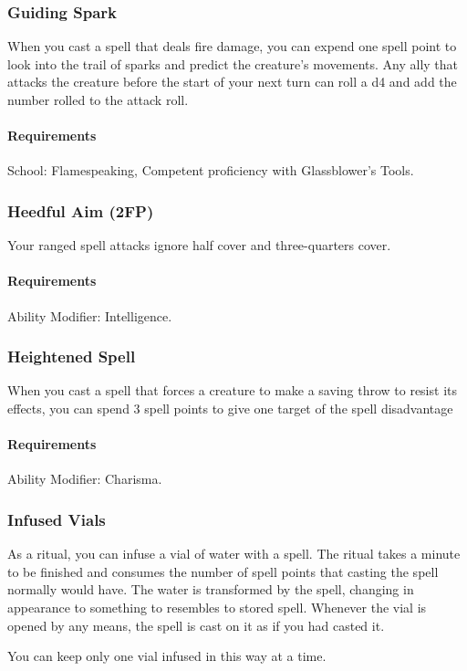 \subsubsection{Guiding Spark} \label{feat::guidingspark}
    When you cast a spell that deals fire damage, you can expend one spell point to look into the trail of sparks and predict the creature's movements.
    Any ally that attacks the creature before the start of your next turn can roll a d4 and add the number rolled to the attack roll.
    \paragraph{Requirements} School: Flamespeaking, Competent proficiency with Glassblower's Tools.
\subsubsection{Heedful Aim (2FP)} \label{feat::heedfulaim}
    Your ranged spell attacks ignore half cover and three-quarters cover.
    \paragraph{Requirements} Ability Modifier: Intelligence.
\subsubsection{Heightened Spell} \label{feat::heightenedspell}
    When you cast a spell that forces a creature to make a saving throw to resist its effects, you can spend 3 spell points to give one target of the spell disadvantage
    \paragraph{Requirements} Ability Modifier: Charisma.
\subsubsection{Infused Vials} \label{feat::infusedvials}
    As a ritual, you can infuse a vial of water with a spell.
    The ritual takes a minute to be finished and consumes the number of spell points that casting the spell normally would have.
    The water is transformed by the spell, changing in appearance to something to resembles to stored spell.
    Whenever the vial is opened by any means, the spell is cast on it as if you had casted it.

    You can keep only one vial infused in this way at a time.

